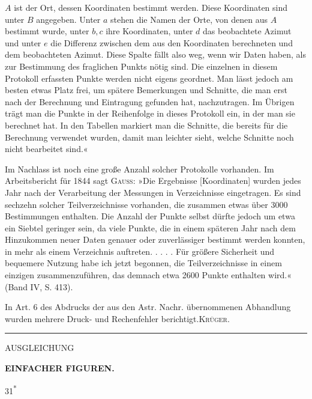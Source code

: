 {\(A\) ist der Ort, dessen Koordinaten bestimmt werden. Diese Koordinaten sind unter \(B\) angegeben. Unter \(a\) stehen die Namen der Orte, von denen aus \(A\) bestimmt wurde, unter \(b,c\) ihre Koordinaten, unter \(d\) das beobachtete Azimut und unter \(e\) die Differenz zwischen dem aus den Koordinaten berechneten und dem beobachteten Azimut. Diese Spalte fällt also weg, wenn wir  Daten haben, als zur Bestimmung des fraglichen Punkts nötig sind. Die einzelnen in diesem Protokoll erfassten Punkte werden nicht eigens geordnet. Man lässt jedoch am besten etwas Platz frei, um spätere Bemerkungen und Schnitte, die man erst nach der Berechnung und Eintragung gefunden hat, nachzutragen. Im Übrigen trägt man die Punkte in der Reihenfolge in dieses Protokoll ein, in der man sie berechnet hat. In den Tabellen markiert man die Schnitte, die bereits für die Berechnung verwendet wurden, damit man leichter sieht, welche Schnitte noch nicht bearbeitet sind.«

Im Nachlass ist noch eine große Anzahl solcher Protokolle vorhanden. Im Arbeitsbericht für 1844 sagt \textsc{Gauss}: »Die Ergebnisse [Koordinaten] wurden jedes Jahr nach der Verarbeitung der Messungen in Verzeichnisse eingetragen. Es sind sechzehn solcher Teilverzeichnisse vorhanden, die zusammen etwas über 3000 Bestimmungen enthalten. Die Anzahl der Punkte selbst dürfte jedoch um etwa ein Siebtel geringer sein, da viele Punkte, die in einem späteren Jahr nach dem Hinzukommen neuer Daten genauer oder zuverlässiger bestimmt werden konnten, in mehr als einem Verzeichnis auftreten. . . . . Für größere Sicherheit und bequemere Nutzung habe ich jetzt begonnen, die Teilverzeichnisse in einem einzigen zusammenzuführen, das demnach etwa 2600 Punkte enthalten wird.« (Band IV, S. 413).

In Art. 6 des Abdrucks der aus den Astr. Nachr. übernommenen Abhandlung wurden mehrere Druck- und Rechenfehler berichtigt.\hfill\textsc{Krüger.}\par
\begin{center}\rule{4cm}{.4pt}\end{center}
}

\par\clearpage

\thispagestyle{empty}
\vspace*{.23\textheight}
{\centering
{\LARGE AUSGLEICHUNG\par}
\medskip
{\LARGE\bfseries EINFACHER FIGUREN.\par}
}
\vfill
\noindent\hfill31\textsuperscript{*}\hspace*{.15\linewidth}\par
\vspace*{.14\textheight}

